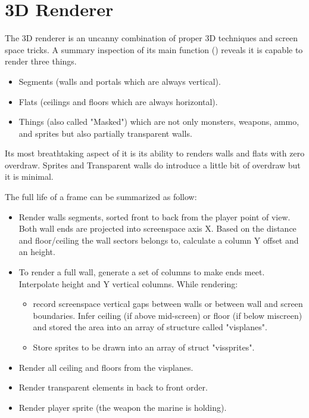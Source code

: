 \section{3D Renderer}
The 3D renderer is an uncanny combination of proper 3D techniques and screen space tricks. A summary inspection of its main function () reveals it is capable to render three things.\\
\par
{}
\par
\begin{itemize}
	\item Segments (walls and portals which are always vertical).
	\item Flats (ceilings and floors which are always horizontal).
	\item Things (also called "Masked") which are not only monsters, weapons, ammo, and sprites but also partially transparent walls.
\end{itemize}
 Its most breathtaking aspect of it is its ability to renders walls and flats with zero overdraw. Sprites and Transparent walls do introduce a little bit of overdraw but it is minimal.\\
\par
The full life of a frame can be summarized as follow:
\begin{itemize}
\item Render walls segments, sorted front to back from the player point of view. Both wall ends are projected into screenspace axis X. Based on the distance and floor/ceiling the wall sectors belongs to, calculate a column Y offset and an height. 
\item To render a full wall, generate a set of columns to make ends meet. Interpolate height and Y vertical columns. While rendering:
   \begin{itemize}
     \item record screenspace vertical gaps between walls or between wall and screen boundaries. Infer ceiling (if above mid-screen) or floor (if below miscreen) and stored the area into an array of structure called "visplanes".
     \item Store sprites to be drawn into an array of struct "vissprites".
   \end{itemize}      
\item Render all ceiling and floors from the visplanes.
\item Render transparent elements in back to front order.
\item Render player sprite (the weapon the marine is holding).
\end{itemize}
